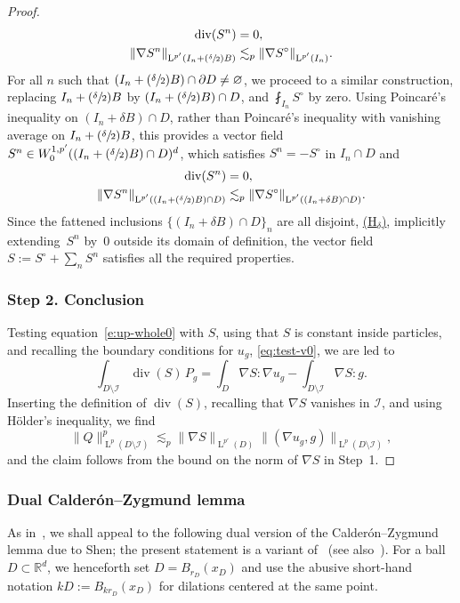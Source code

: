 \documentclass[10pt]{amsart}
\let\mathcal\mathscr
\newcommand{\Hd}{\hyperref[Hd]{\textup{(H$_\delta$)}}\xspace}
\newcommand{\Psfrac}[2]{(\sfrac{#1}{#2})}
\theoremstyle{plain}
\theoremstyle{definition}
\newcommand{\R}{\mathbb R}
\newcommand{\Ic}{\mathcal I}
\newcommand{\Ld}{\operatorname{L}}
\newcommand{\Div}{{\operatorname{div}}}
\newcommand{\step}[1]{\subsubsection*{Step #1}}
\begin{document}
\begin{proof}
\begin{equation}\label{eq:ext-Bogo}
\begin{aligned}
\Div( S^n) &= 0,\\
\|\nabla S^n\|_{\Ld^{p'}(I_n+\Psfrac\delta2 B)}&\lesssim_p\|\nabla S^\circ\|_{\Ld^{p'}(I_n)}.
\end{aligned}
\end{equation}
For all $n$ such that $(I_n+\Psfrac\delta2 B) \cap \partial D \ne \varnothing$,
we proceed to a similar construction, replacing $I_n+\Psfrac\delta2 B$ by $(I_n+\Psfrac\delta2 B)\cap D$, and $\fint_{I_n} S^\circ$ by zero. Using Poincaré's inequality on \mbox{$(I_n+\delta B) \cap D$}, rather than Poincaré's inequality with vanishing average on $I_n+\Psfrac\delta2 B$, this provides a vector field $S^n\in W^{1,p'}_0((I_n+\Psfrac\delta2 B)\cap D)^d$, which satisfies $S^n=-S^\circ$ in $I_n\cap D$ and
\begin{align*}
\Div( S^n) &= 0,\\
\|\nabla S^n\|_{\Ld^{p'}((I_n+\Psfrac\delta2 B)\cap D)}&\lesssim_p \|\nabla S^\circ\|_{\Ld^{p'}((I_n+\delta B)\cap D)}.
\end{align*}
Since the fattened inclusions $\{(I_n+\delta B)\cap D\}_n$ are all disjoint, \cf \Hd, implicitly extending~$S^n$ by~$0$ outside its domain of definition, the vector field $S:=S^\circ+\sum_nS^n$ satisfies all the required properties.

\step{2. Conclusion}
Testing equation~\eqref{e:up-whole0} with $S$, using that $S$ is constant inside particles, and recalling the boundary conditions for $u_g$, \cf \eqref{eq:test-v0}, we are led to
\begin{equation*}
\int_{D\setminus\Ic}\Div(S)\,P_g=\int_{D}\nabla S:\nabla u_g-\int_{D\setminus \Ic}\nabla S:g.
\end{equation*}
Inserting the definition of $\Div(S)$, recalling that $\nabla S$ vanishes in $\Ic$, and using Hölder's inequality, we find
\begin{equation*}
\|Q\|_{\Ld^p(D\setminus\Ic)}^p\lesssim_p \|\nabla S\|_{\Ld^{p'}(D)}\|(\nabla u_g,g)\|_{\Ld^{p}(D\setminus\Ic)},
\end{equation*}
and the claim follows from the bound on the norm of $\nabla S$ in Step~1.
\end{proof}

\subsubsection{Dual Calderón--Zygmund lemma}
As in~\cite{DO1}, we shall appeal to the following dual version of the Calderón--Zygmund lemma due to Shen; the present statement is a variant of~\cite[Th.\,3.2]{Shen-07} (see also~\cite[Th.\,2.4]{Shen-12}).
For a ball $D\subset\R^d$, we henceforth set $D=B_{r_D}(x_D)$ and use the abusive short-hand notation $k D:=B_{k r_D}(x_D)$ for dilations centered at the same point.
\end{document}
